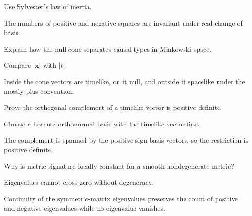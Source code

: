 \begin{hint}
Use Sylvester's law of inertia.
\end{hint}

\begin{solution}
The numbers of positive and negative squares are invariant under real change of basis.
\end{solution}

\begin{exercise}\label{exr:vii29-ped-07}
Explain how the null cone separates causal types in Minkowski space.
\end{exercise}

\begin{hint}
Compare \(|\mathbf x|\) with \(|t|\).
\end{hint}

\begin{solution}
Inside the cone vectors are timelike, on it null, and outside it spacelike under the mostly-plus convention.
\end{solution}

\begin{exercise}\label{exr:vii29-ped-08}
Prove the orthogonal complement of a timelike vector is positive definite.
\end{exercise}

\begin{hint}
Choose a Lorentz-orthonormal basis with the timelike vector first.
\end{hint}

\begin{solution}
The complement is spanned by the positive-sign basis vectors, so the restriction is positive definite.
\end{solution}

\begin{exercise}\label{exr:vii29-ped-09}
Why is metric signature locally constant for a smooth nondegenerate metric?
\end{exercise}

\begin{hint}
Eigenvalues cannot cross zero without degeneracy.
\end{hint}

\begin{solution}
Continuity of the symmetric-matrix eigenvalues preserves the count of positive and negative eigenvalues while no eigenvalue vanishes.
\end{solution}

